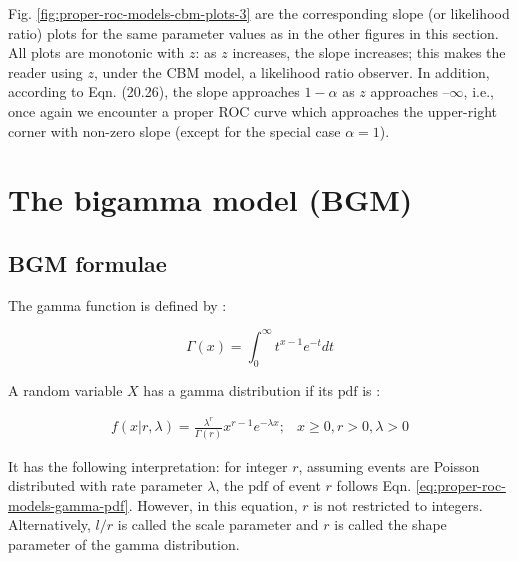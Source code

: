 \documentclass[
]{book}
\begin{document}
Fig. \ref{fig:proper-roc-models-cbm-plots-3} are the corresponding slope (or likelihood ratio) plots for the same parameter values as in the other figures in this section. All plots are monotonic with \(z\): as \(z\) increases, the slope increases; this makes the reader using \(z\), under the CBM model, a likelihood ratio observer. In addition, according to Eqn. (20.26), the slope approaches \(1-\alpha\) as \(z\) approaches \(–\infty\), i.e., once again we encounter a proper ROC curve which approaches the upper-right corner with non-zero slope (except for the special case \(\alpha = 1\)).

\hypertarget{proper-roc-models-bigamma}{%
\section{The bigamma model (BGM)}\label{proper-roc-models-bigamma}}

\hypertarget{proper-roc-models-bigamma-formulae}{%
\subsection{BGM formulae}\label{proper-roc-models-bigamma-formulae}}

The gamma function is defined by \citep{abramowitz1964handbook}:

\begin{equation}
\Gamma\left( x \right) = \int_{0}^{\infty}t^{x-1}e^{-t} dt
\label{eq:proper-roc-models-gamma}
\end{equation}

A random variable \(X\) has a gamma distribution if its \(\text{pdf}\) is \citep{larsen2005introduction}:

\begin{equation}
\begin{matrix}
f\left( x |r,\lambda\right) = \frac{\lambda^r}{\Gamma\left( r \right)}x^{r-1}e^{-\lambda x}; & 
x\ge 0, r>0, \lambda >0
\end{matrix}
\label{eq:proper-roc-models-gamma-pdf}
\end{equation}

It has the following interpretation: for integer \(r\), assuming events are Poisson distributed with rate parameter \(\lambda\), the \(\text{pdf}\) of event \(r\) follows Eqn. \eqref{eq:proper-roc-models-gamma-pdf}. However, in this equation, \(r\) is not restricted to integers. Alternatively, \(l/r\) is called the scale parameter and \(r\) is called the shape parameter of the gamma distribution.
\end{document}
